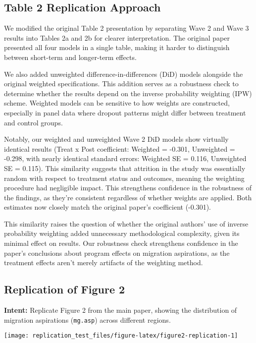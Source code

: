 \documentclass[
]{article}
\begin{document}
\subsection{Table 2 Replication
Approach}\label{table-2-replication-approach}

We modified the original Table 2 presentation by separating Wave 2 and
Wave 3 results into Tables 2a and 2b for clearer interpretation. The
original paper presented all four models in a single table, making it
harder to distinguish between short-term and longer-term effects.

We also added unweighted difference-in-differences (DiD) models
alongside the original weighted specifications. This addition serves as
a robustness check to determine whether the results depend on the
inverse probability weighting (IPW) scheme. Weighted models can be
sensitive to how weights are constructed, especially in panel data where
dropout patterns might differ between treatment and control groups.

Notably, our weighted and unweighted Wave 2 DiD models show virtually
identical results (Treat x Post coefficient: Weighted = -0.301,
Unweighted = -0.298, with nearly identical standard errors: Weighted SE
= 0.116, Unweighted SE = 0.115). This similarity suggests that attrition
in the study was essentially random with respect to treatment status and
outcomes, meaning the weighting procedure had negligible impact. This
strengthens confidence in the robustness of the findings, as they're
consistent regardless of whether weights are applied. Both estimates now
closely match the original paper's coefficient (-0.301).

This similarity raises the question of whether the original authors' use
of inverse probability weighting added unnecessary methodological
complexity, given its minimal effect on results. Our robustness check
strengthens confidence in the paper's conclusions about program effects
on migration aspirations, as the treatment effects aren't merely
artifacts of the weighting method.

\subsection{Replication of Figure 2}\label{replication-of-figure-2}

\textbf{Intent:} Replicate Figure 2 from the main paper, showing the
distribution of migration aspirations (\texttt{mg.asp}) across different
regions.

\begin{center}\texttt{[image: replication\_test\_files/figure-latex/figure2-replication-1]} \end{center}
\end{document}
